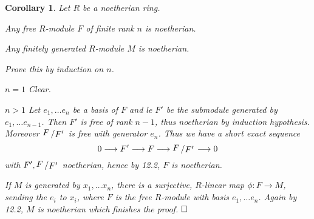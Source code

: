 \documentclass[11pt]{book}
\newtheorem{corollary}[theorem]{Corollary}
\theoremstyle{nonumberbreak}
\newenvironment{pr}[1][]{\ifthenelse{\equal{#1}{}}{\proof}{\proof[#1]}\rm}{\endproof}
\newcommand{\slant}[2]{{\raisebox{.1em}{$#1$}\left/\raisebox{-.1em}{$#2$}\right.}}
\begin{document}
\begin{spacing}{1.3}
\begin{corollary} %
Let $R$ be a noetherian ring.
\begin{compactenum}
\item Any free $R$-module $F$ of finite rank $n$ is noetherian.
\item Any finitely generated $R$-module $M$ is noetherian.
\end{compactenum}
\begin{pr}
\begin{compactenum}
\item Prove this by induction on $n$. 
\begin{compactitem}
\item[\textit{$n=1$}] Clear.
\item[\textit{$n>1$}] Let $e_1, \ldots e_n$ be a basis of $F$ and le $F'$ be the submodule generated by $e_1, \ldots e_{n-1}$. Then $F'$ is free of rank $n-1$, thus noetherian by induction hypothesis. Moreover $\slant{F}{F'}$ is free with generator $e_n$. Thus we have a short exact sequence
$$0 \longrightarrow F' \longrightarrow F \longrightarrow \slant{F}{F'} \longrightarrow 0$$
with $F', \slant{F}{F'}$ noetherian, hence by 12.2, $F$ is noetherian.
\end{compactitem}
\item If $M$ is generated by $x_1, \ldots x_n$, there is a surjective, $R$-linear map $\phi: F \longrightarrow M$, sending the $e_i$ to $x_i$, where $F$ is the free $R$-module with basis $e_1, \ldots e_n$. Again by 12.2, $M$ is noetherian which finishes the proof. $\hfill \Box$
\end{compactenum}
\end{pr}
\end{corollary}


\end{spacing}
\end{document}
